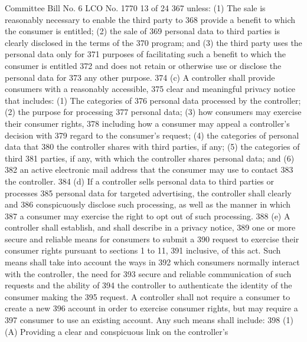 Committee Bill No. 6
LCO No. 1770 13 of 24
367 unless: (1) The sale is reasonably necessary to enable the third party to
368 provide a benefit to which the consumer is entitled; (2) the sale of
369 personal data to third parties is clearly disclosed in the terms of the
370 program; and (3) the third party uses the personal data only for
371 purposes of facilitating such a benefit to which the consumer is entitled
372 and does not retain or otherwise use or disclose the personal data for
373 any other purpose.
374 (c) A controller shall provide consumers with a reasonably accessible,
375 clear and meaningful privacy notice that includes: (1) The categories of
376 personal data processed by the controller; (2) the purpose for processing
377 personal data; (3) how consumers may exercise their consumer rights,
378 including how a consumer may appeal a controller's decision with
379 regard to the consumer's request; (4) the categories of personal data that
380 the controller shares with third parties, if any; (5) the categories of third
381 parties, if any, with which the controller shares personal data; and (6)
382 an active electronic mail address that the consumer may use to contact
383 the controller.
384 (d) If a controller sells personal data to third parties or processes
385 personal data for targeted advertising, the controller shall clearly and
386 conspicuously disclose such processing, as well as the manner in which
387 a consumer may exercise the right to opt out of such processing.
388 (e) A controller shall establish, and shall describe in a privacy notice,
389 one or more secure and reliable means for consumers to submit a
390 request to exercise their consumer rights pursuant to sections 1 to 11,
391 inclusive, of this act. Such means shall take into account the ways in
392 which consumers normally interact with the controller, the need for
393 secure and reliable communication of such requests and the ability of
394 the controller to authenticate the identity of the consumer making the
395 request. A controller shall not require a consumer to create a new
396 account in order to exercise consumer rights, but may require a
397 consumer to use an existing account. Any such means shall include:
398 (1) (A) Providing a clear and conspicuous link on the controller's 

